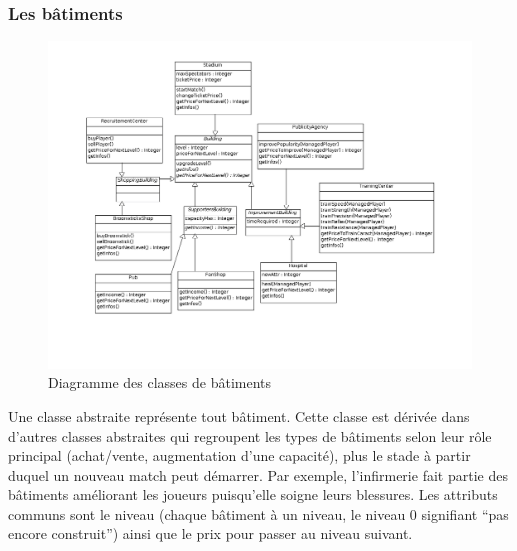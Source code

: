 \documentclass[a4paper,titlepage]{scrreprt}
\begin{document}
  \subsubsection{Les bâtiments}
    \begin{figure}[H]
    \center
    \includegraphics[scale=0.4]{uml/class/DiagrammedeclassesBuildings.png}
    \caption{Diagramme des classes de bâtiments}
    \end{figure}	
  Une classe abstraite représente tout bâtiment. Cette classe est dérivée dans d'autres classes abstraites
  qui regroupent les types de bâtiments selon leur rôle principal (achat/vente, augmentation
  d'une capacité), plus le stade à partir duquel un nouveau match peut démarrer. Par exemple, l'\gls{infirmerie} fait partie des bâtiments
  améliorant les joueurs puisqu'elle soigne leurs blessures.
  Les attributs communs sont le niveau (chaque bâtiment à un niveau, le niveau 0
  signifiant \enquote{pas encore construit}) ainsi que le prix pour passer au niveau suivant.
\end{document}
